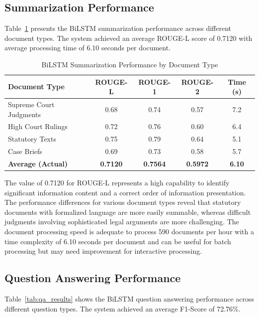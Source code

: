 \documentclass{llncs}
\begin{document}
\subsection{Summarization Performance}

Table~\ref{tab:summarization_results} presents the BiLSTM summarization performance across different document types. The system achieved an average ROUGE-L score of 0.7120 with average processing time of 6.10 seconds per document.

\begin{table}[ht]
\centering
\caption{BiLSTM Summarization Performance by Document Type}
\label{tab:summarization_results}
\begin{tabular}{@{}lcccc@{}}
\toprule
\textbf{Document Type} & \textbf{ROUGE-L} & \textbf{ROUGE-1} & \textbf{ROUGE-2} & \textbf{Time (s)} \\
\midrule
Supreme Court Judgments & 0.68 & 0.74 & 0.57 & 7.2 \\
High Court Rulings      & 0.72 & 0.76 & 0.60 & 6.4 \\
Statutory Texts         & 0.75 & 0.79 & 0.64 & 5.1 \\
Case Briefs             & 0.69 & 0.73 & 0.58 & 5.7 \\
\midrule
\textbf{Average (Actual)} & \textbf{0.7120} & \textbf{0.7564} & \textbf{0.5972} & \textbf{6.10} \\
\bottomrule
\end{tabular}
\end{table}

The value of 0.7120 for ROUGE-L represents a high capability to identify significant information content and a correct order of information presentation. The performance differences for various document types reveal that statutory documents with formalized language are more easily summable, whereas difficult judgments involving sophisticated legal arguments are more challenging. The document processing speed is adequate to process 590 documents per hour with a time complexity of 6.10 seconds per document and can be useful for batch processing but may need improvement for interactive processing.

\subsection{Question Answering Performance}

Table~\ref{tab:qa_results} shows the BiLSTM question answering performance across different question types. The system achieved an average F1-Score of 72.76\%.
\end{document}
